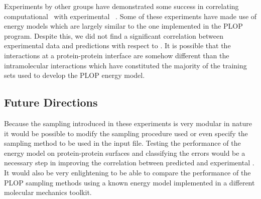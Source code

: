 Experiments by other groups have demonstrated some success in correlating computational \ddg\ with experimental \ddg\ \cite{kortemme2004computational}.
Some of these experiments have made use of energy models which are largely similar to the one implemented in the PLOP program.
Despite this, we did not find a significant correlation between experimental data and predictions with respect to \ddg.
It is possible that the interactions at a protein-protein interface are somehow different than the intramolecular interactions which have constituted the majority of the training sets used to develop the PLOP energy model.

\subsection{Future Directions}
Because the sampling introduced in these experiments is very modular in nature it would be possible to modify the sampling procedure used or even specify the sampling method to be used in the input file.
Testing the performance of the energy model on protein-protein surfaces and classifying the errors would be a necessary step in improving the correlation between predicted and experimental \ddg.
It would also be very enlightening to be able to compare the performance of the PLOP sampling methods using a known energy model implemented in a different molecular mechanics toolkit.

